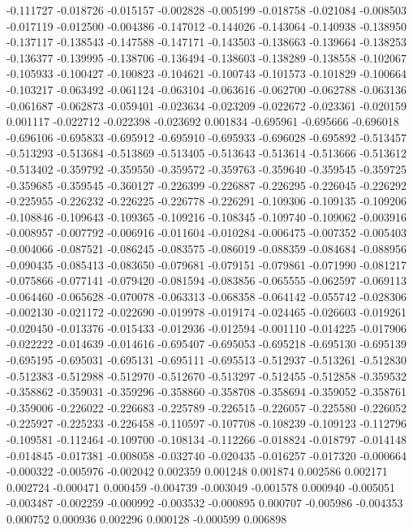 -0.111727
-0.018726
-0.015157
-0.002828
-0.005199
-0.018758
-0.021084
-0.008503
-0.017119
-0.012500
-0.004386
-0.147012
-0.144026
-0.143064
-0.140938
-0.138950
-0.137117
-0.138543
-0.147588
-0.147171
-0.143503
-0.138663
-0.139664
-0.138253
-0.136377
-0.139995
-0.138706
-0.136494
-0.138603
-0.138289
-0.138558
-0.102067
-0.105933
-0.100427
-0.100823
-0.104621
-0.100743
-0.101573
-0.101829
-0.100664
-0.103217
-0.063492
-0.061124
-0.063104
-0.063616
-0.062700
-0.062788
-0.063136
-0.061687
-0.062873
-0.059401
-0.023634
-0.023209
-0.022672
-0.023361
-0.020159
0.001117
-0.022712
-0.022398
-0.023692
0.001834
-0.695961
-0.695666
-0.696018
-0.696106
-0.695833
-0.695912
-0.695910
-0.695933
-0.696028
-0.695892
-0.513457
-0.513293
-0.513684
-0.513869
-0.513405
-0.513643
-0.513614
-0.513666
-0.513612
-0.513402
-0.359792
-0.359550
-0.359572
-0.359763
-0.359640
-0.359545
-0.359725
-0.359685
-0.359545
-0.360127
-0.226399
-0.226887
-0.226295
-0.226045
-0.226292
-0.225955
-0.226232
-0.226225
-0.226778
-0.226291
-0.109306
-0.109135
-0.109206
-0.108846
-0.109643
-0.109365
-0.109216
-0.108345
-0.109740
-0.109062
-0.003916
-0.008957
-0.007792
-0.006916
-0.011604
-0.010284
-0.006475
-0.007352
-0.005403
-0.004066
-0.087521
-0.086245
-0.083575
-0.086019
-0.088359
-0.084684
-0.088956
-0.090435
-0.085413
-0.083650
-0.079681
-0.079151
-0.079861
-0.071990
-0.081217
-0.075866
-0.077141
-0.079420
-0.081594
-0.083856
-0.065555
-0.062597
-0.069113
-0.064460
-0.065628
-0.070078
-0.063313
-0.068358
-0.064142
-0.055742
-0.028306
-0.002130
-0.021172
-0.022690
-0.019978
-0.019174
-0.024465
-0.026603
-0.019261
-0.020450
-0.013376
-0.015433
-0.012936
-0.012594
-0.001110
-0.014225
-0.017906
-0.022222
-0.014639
-0.014616
-0.695407
-0.695053
-0.695218
-0.695130
-0.695139
-0.695195
-0.695031
-0.695131
-0.695111
-0.695513
-0.512937
-0.513261
-0.512830
-0.512383
-0.512988
-0.512970
-0.512670
-0.513297
-0.512455
-0.512858
-0.359532
-0.358862
-0.359031
-0.359296
-0.358860
-0.358708
-0.358694
-0.359052
-0.358761
-0.359006
-0.226022
-0.226683
-0.225789
-0.226515
-0.226057
-0.225580
-0.226052
-0.225927
-0.225233
-0.226458
-0.110597
-0.107708
-0.108239
-0.109123
-0.112796
-0.109581
-0.112464
-0.109700
-0.108134
-0.112266
-0.018824
-0.018797
-0.014148
-0.014845
-0.017381
-0.008058
-0.032740
-0.020435
-0.016257
-0.017320
-0.000664
-0.000322
-0.005976
-0.002042
0.002359
0.001248
0.001874
0.002586
0.002171
0.002724
-0.000471
0.000459
-0.004739
-0.003049
-0.001578
0.000940
-0.005051
-0.003487
-0.002259
-0.000992
-0.003532
-0.000895
0.000707
-0.005986
-0.004353
0.000752
0.000936
0.002296
0.000128
-0.000599
0.006898

